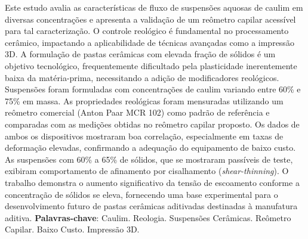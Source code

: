 \documentclass[article,12pt,oneside,a4paper,english,brazil,sumario=tradicional]{abntex2}
\begin{document}
\frenchspacing          %

\maketitle %

\begin{resumo}
\noindent
Este estudo avalia as características de fluxo de suspensões aquosas de caulim em diversas concentrações e apresenta a validação de um reômetro capilar acessível para tal caracterização. O controle reológico é fundamental no processamento cerâmico, impactando a aplicabilidade de técnicas avançadas como a impressão 3D. A formulação de pastas cerâmicas com elevada fração de sólidos é um objetivo tecnológico, frequentemente dificultado pela plasticidade inerentemente baixa da matéria-prima, necessitando a adição de modificadores reológicos. Suspensões foram formuladas com concentrações de caulim variando entre 60\% e 75\% em massa. As propriedades reológicas foram mensuradas utilizando um reômetro comercial (Anton Paar MCR 102) como padrão de referência e comparadas com as medições obtidas no reômetro capilar proposto. Os dados de ambos os dispositivos mostraram boa correlação, especialmente em taxas de deformação elevadas, confirmando a adequação do equipamento de baixo custo. As suspensões com 60\% a 65\% de sólidos, que se mostraram passíveis de teste, exibiram comportamento de afinamento por cisalhamento (\textit{shear-thinning}). O trabalho demonstra o aumento significativo da tensão de escoamento conforme a concentração de sólidos se eleva, fornecendo uma base experimental para o desenvolvimento futuro de pastas cerâmicas aditivadas destinadas à manufatura aditiva.
\vspace{\onelineskip}
\noindent
\textbf{Palavras-chave}: Caulim. Reologia. Suspensões Cerâmicas. Reômetro Capilar. Baixo Custo. Impressão 3D.
\end{resumo}

\textual
\pagestyle{simple}
\thispagestyle{empty}

\end{document}
